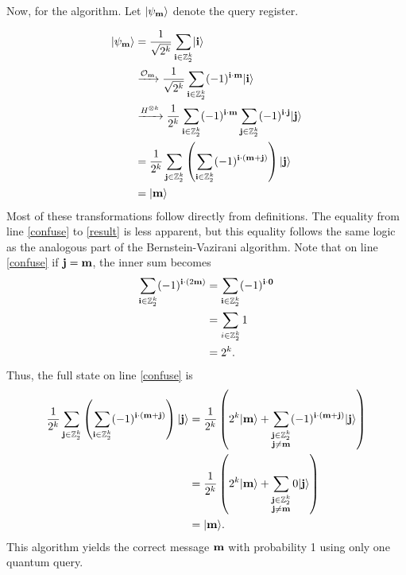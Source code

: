 \documentclass[12pt,twoside]{reedthesis}
\theoremstyle{definition}
\newlength{\arrow}
\newcommand{\Z}{\mathbb{Z}}
\newcommand{\ket}[1]{\ensuremath{\lvert #1\rangle}\xspace}
\begin{document}
Now, for the algorithm. Let $\ket{\psi_\mess}$ denote the query register.

\begin{align}
\ket{\psi_\mess}
& =  \frac{1}{\sqrt{2^\mlen}} \sum_{\mathbf{i} \in \Z_2^\mlen} \ket{\mathbf{i}} \\
& \xrightarrow{\mathcal{O}_\mess} \frac{1}{\sqrt{2^\mlen}} \sum_{\mathbf{i} \in \Z_2^\mlen} (-1)^{\mathbf{i} \cdot \mess} \ket{\mathbf{i}} \\
& \xrightarrow{H^{\otimes \mlen}} \frac{1}{2^\mlen} \sum_{\mathbf{i} \in \Z_2^\mlen} (-1)^{\mathbf{i} \cdot \mess} \sum_{\mathbf{j} \in \Z_2^\mlen} (-1)^{\mathbf{i} \cdot \mathbf{j}} \ket{\mathbf{j}} \\
& = \frac{1}{2^\mlen} \sum_{\mathbf{j} \in \Z_2^\mlen} \left( \sum_{\mathbf{i} \in \Z_2^\mlen} (-1)^{\mathbf{i}\cdot (\mess +\mathbf{j})} \right) \ket{\mathbf{j}} \label{confuse}\\
& = \ket{\mess} \label{result}
\end{align}
Most of these transformations follow directly from definitions. The equality from line \ref{confuse} to \ref{result} is less apparent, but this equality follows the same logic as the analogous part of the Bernstein-Vazirani algorithm. Note that on line \ref{confuse} if $\mathbf{j} = \mathbf{m}$, the inner sum becomes 
\begin{align*}
\sum_{\mathbf{i} \in \Z_2^\mlen} (-1)^{\mathbf{i} \cdot (2\mess)} 
&  = \sum_{\mathbf{i} \in \Z_2^\mlen} (-1)^{\mathbf{i} \cdot \mathbf{0}} \\
&= \sum_{i \in \Z_2^\mlen} 1 \\
& = {2^\mlen}.
\end{align*}
Thus, the full state on line \ref{confuse} is 
\begin{align*}
\frac{1}{2^\mlen} \sum_{\mathbf{j} \in \Z_2^\mlen} \left( \sum_{\mathbf{i} \in \Z_2^\mlen} (-1)^{\mathbf{i}\cdot (\mess +\mathbf{j})} \right) \ket{\mathbf{j}}
& = \frac{1}{2^\mlen} \left (2^\mlen \ket{\mess}+  \sum\limits_{\substack{\mathbf{j} \in \Z_2^\mlen \\ \mathbf{j} \neq \mess}}
 (-1)^{\mathbf{i}\cdot (\mess +\mathbf{j})}\ket{\mathbf{j}} \right) \\
 & = \frac{1}{2^\mlen} \left (2^\mlen \ket{\mess}+  \sum\limits_{\substack{\mathbf{j} \in \Z_2^\mlen \\ \mathbf{j} \neq \mess}}
0\ket{\mathbf{j}} \right) \\
& = \ket{\mess}.
\end{align*}
This algorithm yields the correct message $\mathbf{m}$ with probability 1 using only one quantum query.
\end{document}
